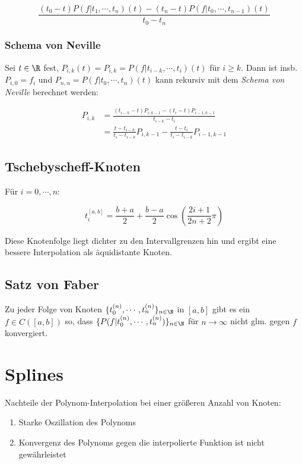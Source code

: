 \vspace{-2mm}
$$\frac{(t_0-t)P(f|t_1,\cdots,t_n)(t)-(t_n-t)P(f|t_0,\cdots,t_{n-1})(t)}{t_0-t_n}$$

\subsubsection*{Schema von Neville}

Sei $t \in \R$ fest, $P_{i,k}(t)=P_{i,k}=P(f|t_{i-k},\cdots,t_i)(t)$ für $i\geq k$. Dann ist insb. $P_{i,0}=f_i$ und $P_{n,n}=P(f|t_0,\cdots,t_n)(t)$ kann rekursiv mit dem \emph{Schema von Neville} berechnet werden:

\vspace{-4mm}
\begin{align*}
P_{i,k} &= \frac{(t_{i-k}-t)P_{i,k-1} - (t_i-t)P_{i-1,k-1}}{t_{i-k}-t_i} \\
        &= \frac{t-t_{i-k}}{t_i-t_{i-k}} P_{i,k-1} - \frac{t-t_i}{t_i-t_{i-k}} P_{i-1,k-1}
\end{align*}

\subsection*{Tschebyscheff-Knoten}

Für $i = 0,\cdots,n$:

\vspace{-2mm}
$$t_i^{[a,b]} = \frac{b+a}{2} + \frac{b-a}{2} \cos\left(\frac{2i+1}{2n+2} \pi\right)$$

Diese Knotenfolge liegt dichter zu den Intervallgrenzen hin und ergibt eine bessere Interpolation als äquidistante Knoten.

\subsection*{Satz von Faber}

Zu jeder Folge von Knoten $\{t_0^{(n)},\cdots,t_n^{(n)}\}_{n \in \N}$ in $[a,b]$ gibt es ein $f \in C([a,b])$ so, dass $\{P(f|t_0^{(n)},\cdots,t_n^{(n)})\}_{n \in \N}$ für $n \to \infty$ nicht glm. gegen $f$ konvergiert.

\section*{Splines}

Nachteile der Polynom-Interpolation bei einer größeren Anzahl von Knoten:

\begin{enumerate}
	\item Starke Oszillation des Polynoms
	\item Konvergenz des Polynoms gegen die interpolierte Funktion ist nicht gewährleistet
\end{enumerate}

